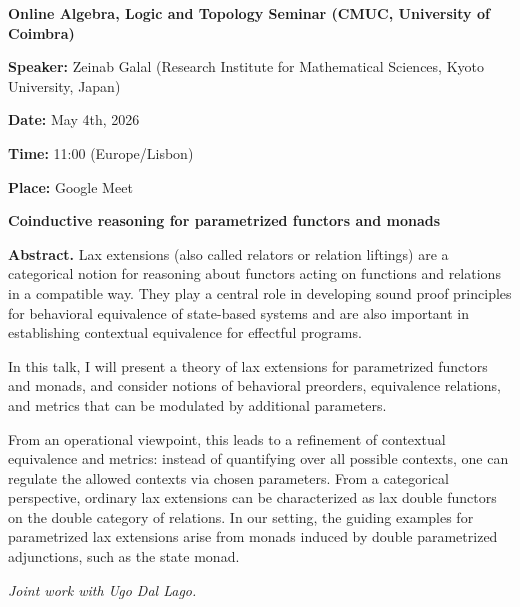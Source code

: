\documentclass[11pt]{article}
\begin{document}
	
	\begin{center}
		{\Large \textbf{Online Algebra, Logic and Topology Seminar (CMUC, University of Coimbra)}}
	\end{center}
	
	\vspace{0.5cm}
	
	\noindent
	\textbf{Speaker:} Zeinab Galal (Research Institute for Mathematical Sciences, Kyoto University, Japan)
	
	\vspace{0.2cm}
	
	\noindent
	\textbf{Date:} May 4th, 2026
	
	\noindent
	\textbf{Time:} 11:00 (Europe/Lisbon)
	
	\noindent
	\textbf{Place:} Google Meet
	
	\vspace{0.5cm}
	
	\begin{center}
		{\Large \textbf{Coinductive reasoning for parametrized functors and monads}}
	\end{center}
	
	\vspace{0.5cm}
	
	\noindent
	\textbf{Abstract.}
	Lax extensions (also called relators or relation liftings) are a categorical notion for reasoning about functors acting on functions and relations in a compatible way. They play a central role in developing sound proof principles for behavioral equivalence of state-based systems and are also important in establishing contextual equivalence for effectful programs.
	
	In this talk, I will present a theory of lax extensions for parametrized functors and monads, and consider notions of behavioral preorders, equivalence relations, and metrics that can be modulated by additional parameters.
	
	From an operational viewpoint, this leads to a refinement of contextual equivalence and metrics: instead of quantifying over all possible contexts, one can regulate the allowed contexts via chosen parameters. From a categorical perspective, ordinary lax extensions can be characterized as lax double functors on the double category of relations. In our setting, the guiding examples for parametrized lax extensions arise from monads induced by double parametrized adjunctions, such as the state monad.
	
	\vspace{0.3cm}
	
	\noindent
	\textit{Joint work with Ugo Dal Lago.}
	
\end{document}
